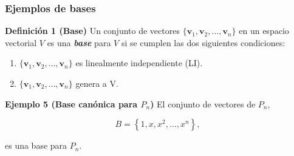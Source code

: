 \begin{frame}\frametitle{Ejemplos de bases}

\begin{block}{\textbf{Definición 1 (Base)}}
	\justifying
	Un conjunto de vectores $\{\mathbf{v}_1, \mathbf{v}_2, \hdots , \mathbf{v}_n \}$ en un espacio vectorial $V$ es 
	una \textbf{\textit{base}} para $V$ si se cumplen las dos siguientes condiciones:
	\begin{enumerate}
		\item[\labelname{$a$}] $\{\mathbf{v}_1, \mathbf{v}_2, \hdots , \mathbf{v}_n \}$ es linealmente independiente (LI).
		\item[\labelname{$a$}] $\{\mathbf{v}_1, \mathbf{v}_2, \hdots , \mathbf{v}_n \}$ genera a V.
	\end{enumerate}
\end{block}


\begin{ej}{\textbf{Ejemplo 5 (Base canónica para $P_n$)}} \justifying
	El conjunto de vectores de $P_n$,
	
	\vspace{-2mm}
	\[
	B = \left\{ 1, x, x^2, \hdots, x^n \right\},
	\]
	
	\vspace{-2mm}
	es una base para $P_n$.
\end{ej}	

\end{frame}


\subsection{}

